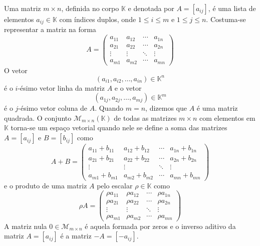 \begin{exemplo}
  Uma matriz $m\times n$, definida no corpo ${\mathbb{K}}$ e denotada por $A = [a_{ij}]$, é uma lista de elementos $a_{ij} \in {\mathbb{K}}$ com índices duplos, onde $1\leq i\leq m$ e $1\leq j \leq n$. Costuma-se representar a matriz na forma
  \begin{equation*}
    A = 
      \begin{pmatrix}
        a_{11} & a_{12} & \cdots & a_{1n}\\
        a_{21} & a_{22} & \cdots & a_{2n}\\
        \vdots & \vdots & \ddots & \vdots\\
        a_{m1} & a_{m2} & \cdots & a_{mn}
      \end{pmatrix}
  \end{equation*}
  O vetor 
  \begin{equation*}
    (a_{i1},a_{i2},\ldots,a_{in})\in {\mathbb{K}}^n
  \end{equation*}
  é o $i$-ésimo vetor linha da matriz $A$ e o vetor 
  \begin{equation*}
    (a_{1j},a_{2j},\ldots,a_{mj})\in {\mathbb{K}}^m
  \end{equation*}
  é o $j$-ésimo vetor coluna de $A$. Quando $m=n$, dizemos que $A$ é uma matriz quadrada. O conjunto ${\mathcal{M}}_{m\times n}({\mathbb{K}})$ de todas as matrizes $m\times n$ com elementos em ${\mathbb{K}}$ torna-se um espaço vetorial quando nele se define a soma das matrizes $A=[a_{ij}]$ e $B=[b_{ij}]$ como
  \begin{equation*}
    A+B = 
      \begin{pmatrix}
        a_{11}+b_{11} & a_{12}+b_{12} & \cdots & a_{1n}+b_{1n}\\
        a_{21}+b_{21} & a_{22}+b_{22} & \cdots & a_{2n}+b_{2n}\\
        \vdots & \vdots & \ddots & \vdots\\
        a_{m1}+b_{m1} & a_{m2}+b_{m2} & \cdots & a_{mn}+b_{mn}
      \end{pmatrix}
  \end{equation*}
  e o produto de uma matriz $A$ pelo escalar $\rho \in {\mathbb{K}}$ como 
  \begin{equation*}
    \rho A = 
      \begin{pmatrix}
        \rho a_{11} & \rho a_{12} & \cdots & \rho a_{1n}\\
        \rho a_{21} & \rho a_{22} & \cdots & \rho a_{2n}\\
        \vdots & \vdots & \ddots & \vdots\\
        \rho a_{m1} & \rho a_{m2} & \cdots & \rho a_{mn}
      \end{pmatrix}
  \end{equation*}
  A matriz nula $0 \in {\mathcal{M}}_{m\times n}$ é aquela formada por zeros e o inverso aditivo da matriz $A=[a_{ij}]$ é a matriz $-A =[-a_{ij}]$.
\end{exemplo}

